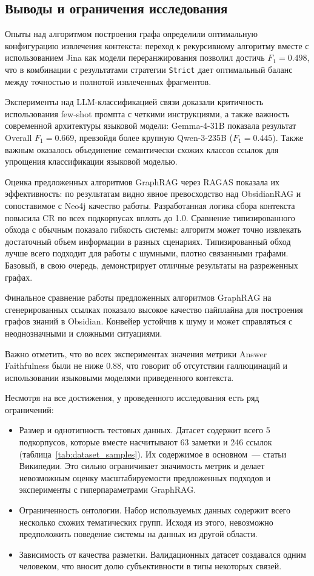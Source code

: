 \subsection{Выводы и ограничения исследования}
\label{sec:conclusions}

Опыты над алгоритмом построения графа определили оптимальную конфигурацию
извлечения контекста: переход к рекурсивному алгоритму вместе с использованием
Jina как модели переранжирования позволил достичь $F_1 = 0.498$,
что в комбинации с результатами стратегии \texttt{Strict} дает
оптимальный баланс между точностью и полнотой извлеченных фрагментов.

Эксперименты над LLM-классификацией связи доказали критичность использования
few-shot промпта с четкими инструкциями, а также важность современной архитектуры языковой модели:
Gemma-4-31B показала результат Overall $F_1 = 0.669$,
превзойдя более крупную Qwen-3-235B ($F_1 = 0.445$).
Также важным оказалось объединение семантически схожих классов ссылок
для упрощения классификации языковой моделью.

Оценка предложенных алгоритмов GraphRAG через RAGAS
показала их эффективность:
по результатам видно явное превосходство над ObsidianRAG
и сопоставимое с Neo4j качество работы.
Разработанная логика сбора контекста повысила CR по всех подкорпусах вплоть до 1.0.
Сравнение типизированного обхода с обычным показало гибкость системы:
алгоритм может точно извлекать достаточный объем информации в разных сценариях.
Типизированный обход лучше всего подходит для работы с
шумными, плотно связанными графами.
Базовый, в свою очередь, демонстрирует отличные результаты на разреженных графах.

Финальное сравнение работы предложенных алгоритмов GraphRAG
на сгенерированных ссылках показало высокое качество пайплайна для построения графов знаний в Obsidian.
Конвейер устойчив к шуму и может справляться с неоднозначными и сложными ситуациями.

Важно отметить, что во всех экспериментах значения метрики Answer Faithfulness
были не ниже 0.88,
что говорит об отсутствии галлюцинаций и использовании языковыми моделями приведенного контекста.

Несмотря на все достижения,
у проведенного исследования есть ряд ограничений:
\begin{itemize}
    \item Размер и однотипность тестовых данных.
          Датасет содержит всего 5 подкорпусов, которые вместе
          насчитывают 63 заметки и 246 ссылок (таблица~\ref{tab:dataset_samples}).
          Их содержимое в основном~--- статьи Википедии.
          Это сильно ограничивает значимость метрик
          и делает невозможным оценку масштабируемости предложенных подходов
          и эксперименты с гиперпараметрами GraphRAG.
    \item Ограниченность онтологии.
          Набор используемых данных содержит всего несколько схожих тематических групп.
          Исходя из этого, невозможно предположить поведение системы на данных из другой области.
    \item Зависимость от качества разметки.
          Валидационных датасет создавался одним человеком,
          что вносит долю субъективности в типы некоторых связей.
\end{itemize}
